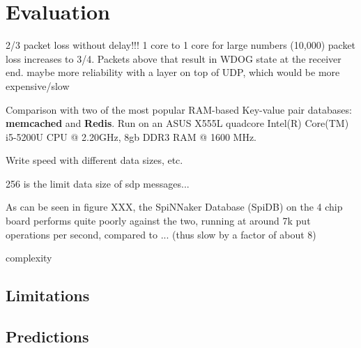 \chapter{Evaluation}
\label{cha:eval}


2/3 packet loss without delay!!! 1 core to 1 core
for large numbers (10,000) packet loss increases to 3/4. Packets above that result in WDOG state at the receiver end.
maybe more reliability with a layer on top of UDP, which would be more expensive/slow


Comparison with two of the most popular RAM-based Key-value pair databases: \textbf{memcached} and \textbf{Redis}.
Run on an ASUS X555L quadcore Intel(R) Core(TM) i5-5200U CPU @ 2.20GHz, 8gb DDR3 RAM @ 1600 MHz.

Write speed with different data sizes, etc.

256 is the limit data size of sdp messages...

As can be seen in figure XXX, the SpiNNaker Database (SpiDB) on the 4 chip board performs quite poorly against the two, running at around 7k put operations per second, compared to ... (thus slow by a factor of about 8) 

complexity

\section{Limitations}

\section{Predictions}